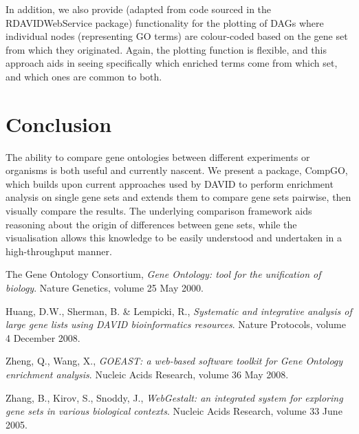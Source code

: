 \documentclass[11pt, oneside]{article}
\begin{document}
In addition, we also provide (adapted from code sourced in the RDAVIDWebService package) functionality for the plotting of DAGs where individual nodes (representing GO terms) are colour-coded based on the gene set from which they originated. Again, the plotting function is flexible, and this approach aids in seeing specifically which enriched terms come from which set, and which ones are common to both.

\section*{Conclusion}
The ability to compare gene ontologies between different experiments or organisms is both useful and currently nascent. We present a package, CompGO, which builds upon current approaches used by DAVID to perform enrichment analysis on single gene sets and extends them to compare gene sets pairwise, then visually compare the results. The underlying comparison framework aids reasoning about the origin of differences between gene sets, while the visualisation allows this knowledge to be easily understood and undertaken in a high-throughput manner.\\


\begin{thebibliography}{}

	The Gene Ontology Consortium, 
	\emph{Gene Ontology: tool for the unification of biology}.
	Nature Genetics, volume 25
	May 2000.

	Huang, D.W., Sherman, B. \& Lempicki, R.,
	\emph{Systematic and integrative analysis of large gene lists using DAVID bioinformatics resources}.
	Nature Protocols, volume 4
	December 2008.

	Zheng, Q., Wang, X.,
	\emph{GOEAST: a web-based software toolkit for Gene Ontology enrichment analysis}.
	Nucleic Acids Research, volume 36
	May 2008.

	Zhang, B., Kirov, S., Snoddy, J.,
	\emph{WebGestalt: an integrated system for exploring gene sets in various biological contexts}.
	Nucleic Acids Research, volume 33
	June 2005.

\end{thebibliography}
\end{document}
